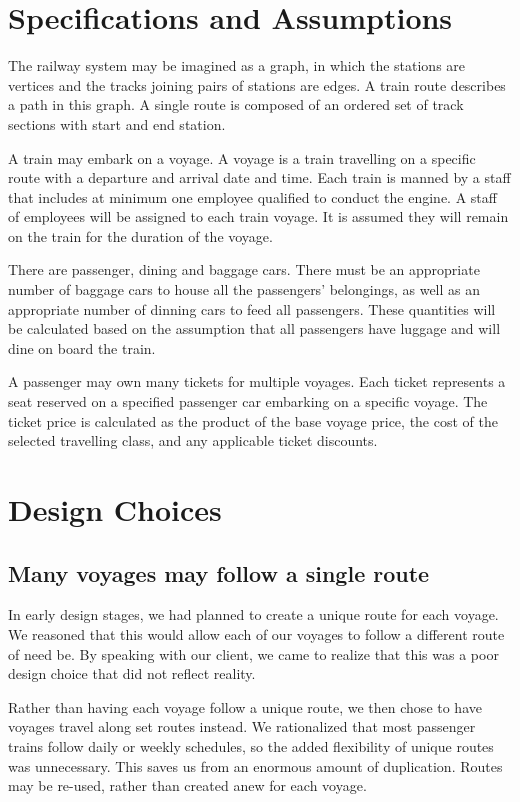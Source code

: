 \documentclass[a4paper]{article}
\begin{document}
\section{Specifications and Assumptions}
The railway system may be imagined as a graph, in which the stations are vertices and the tracks joining pairs of stations are edges. A train route describes a path in this graph.  A single route is composed of an ordered set of track sections with start and end station.

A train may embark on a voyage. A voyage is a train travelling on a specific route with a departure and arrival date and time. Each train is manned by a staff that includes at minimum one employee qualified to conduct the engine. A staff of employees will be assigned to each train voyage. It is assumed they will remain on the train for the duration of the voyage.  

There are passenger, dining and baggage cars. There must be an appropriate number of baggage cars to house all the passengers’ belongings, as well as an appropriate number of dinning cars to feed all passengers. These quantities will be calculated based on the assumption that all passengers have luggage and will dine on board the train. 

A passenger may own many tickets for multiple voyages. Each ticket represents a seat reserved on a specified passenger car embarking on a specific voyage. The ticket price is calculated as the product of the base voyage price, the cost of the selected travelling class, and any applicable ticket discounts. 


\section{Design Choices}
\subsection*{Many voyages may follow a single route}
In early design stages, we had planned to create a unique route for each voyage. We reasoned that this would allow each of our voyages to follow a different route of need be. By speaking with our client, we came to realize that this was a poor design choice that did not reflect reality. 

Rather than having each voyage follow a unique route, we then chose to have voyages travel along set routes instead. We rationalized that most passenger trains follow daily or weekly schedules, so the added flexibility of unique routes was unnecessary. This saves us from an enormous amount of duplication. Routes may be re-used, rather than created anew for each voyage.
\end{document}
